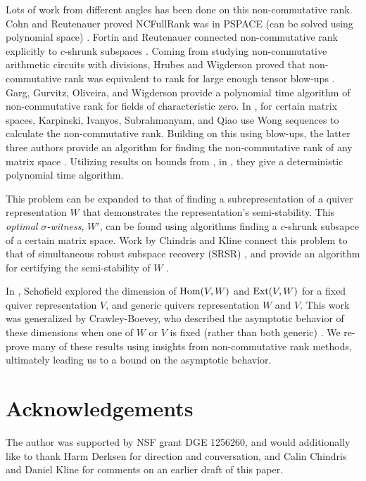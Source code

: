 \documentclass[12pt]{amsart}
\begin{document}
Lots of work from different angles has been done on this non-commutative rank. Cohn and Reutenauer proved NCFullRank was in PSPACE (can be solved using polynomial space) \cite{CR99}. Fortin and Reutenauer connected non-commutative rank explicitly to $c$-shrunk subspaces \cite{FR04}. Coming from studying non-commutative arithmetic circuits with divisions, Hrubes and Wigderson proved that non-commutative rank was equivalent to rank for large enough tensor blow-ups \cite{HW14}. Garg, Gurvitz, Oliveira, and Wigderson provide a polynomial time algorithm of non-commutative rank for fields of characteristic zero. In \cite{IKQS15}, for certain matrix spaces, Karpinski, Ivanyos, Subrahmanyam, and Qiao use Wong sequences to calculate the non-commutative rank. Building on this using blow-ups, the latter three authors provide an algorithm for finding the non-commutative rank of any matrix space \cite{IQS17}. Utilizing results on bounds from \cite{DM18b}, in \cite{IQS18}, they give a deterministic polynomial time algorithm.  

This problem can be expanded to that of finding a subrepresentation of a quiver representation $W$ that demonstrates the representation's semi-stability. This \emph{optimal $\sigma$-witness}, $W'$, can be found using algorithms finding a $c$-shrunk subsapce of a certain matrix space. Work by Chindris and Kline connect this problem to that of simultaneous robust subspace recovery (SRSR) \cite{CK20a}, and provide an algorithm for certifying the semi-stability of $W$ \cite{CK21B}.

In \cite{Scho92}, Schofield explored the dimension of $\operatorname{Hom}(V,W)$ and $\operatorname{Ext}(V,W)$ for a fixed quiver representation $V$, and generic quivers representation $W$ and $V$. This work was generalized by Crawley-Boevey, who described the asymptotic behavior of these dimensions when one of $W$ or $V$ is fixed (rather than both generic) \cite{Craw96}. We re-prove many of these results using insights from non-commutative rank methods, ultimately leading us to a bound on the asymptotic behavior.







%

\section{Acknowledgements}
The author was supported by NSF grant DGE 1256260, and would additionally like to thank Harm Derksen for direction and conversation, and Calin Chindris and Daniel Kline for comments on an earlier draft of this paper.

{}

\end{document}
